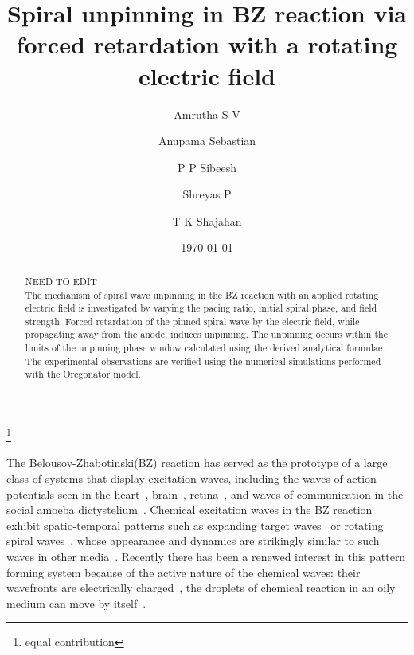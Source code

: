 \documentclass[%
 reprint,
 amsmath,amssymb,
 aps,
prb,
]{revtex4-2}
\begin{document}

\title{Spiral unpinning in BZ reaction via forced retardation with a rotating electric field }%


\author{Amrutha S V}
\thanks{equal contribution}%
\author{Anupama Sebastian}%

\author{P P Sibeesh}
\author{Shreyas P}
\author{T K Shajahan}


\date{\today}%

\begin{abstract}
	NEED TO EDIT\\
The mechanism of spiral wave unpinning in the BZ reaction with an applied rotating electric field is investigated by varying the pacing ratio, initial spiral phase, and field strength. Forced retardation of the pinned spiral wave by the electric field, while propagating away from the anode, induces unpinning. The unpinning occurs within the limits of the unpinning phase window calculated using the derived analytical formulae. The experimental observations are verified using the numerical simulations performed with the Oregonator model.
\end{abstract}

                             
\maketitle


The Belousov-Zhabotinski(BZ) reaction has served as the prototype of a large
class of systems that display excitation waves, including the waves of action
potentials seen in the heart~\cite{Luther2011}, brain~\cite{Huang2004}, retina~\cite{???},
and waves of communication in the social amoeba dictystelium~\cite{???}.  
Chemical excitation waves in the BZ reaction exhibit spatio-temporal 
patterns such as expanding target waves~\cite{zhang2019stability} or rotating spiral
waves~\cite{zykov2018spiral}, whose appearance and dynamics are strikingly
similar to such waves in other media~\cite{sinha2014patterns}.  Recently there
has been a renewed interest in this pattern forming system because of the
active nature of the chemical waves: their wavefronts are electrically
charged~\cite{Amrutha,steinbock1992electric}, the droplets of chemical reaction in an oily medium
can move by itself~\cite{jin2017chemotaxis, ryabchun2022run}.
\end{document}
